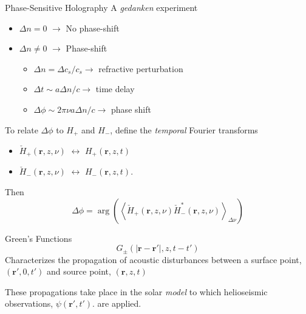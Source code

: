 \documentclass{beamer}
\begin{document}
\begin{frame}{Phase-Sensitive Holography}
{A \emph{gedanken} experiment}
    \begin{itemize}
        \item $\Delta{n} = 0$ $\rightarrow$ No phase-shift
        \item $\Delta{n} \neq 0$ $\rightarrow$ Phase-shift
            \begin{itemize}
                \item $\Delta{n} = \Delta{c_{s}}/c_{s} \rightarrow$
                    refractive perturbation
                \item $\Delta{t} \sim a\Delta{n}/c \rightarrow$
                    time delay
                \item $\Delta{\phi} \sim 2\pi\nu a\Delta{n}/c \rightarrow$
                    phase shift
            \end{itemize}
    \end{itemize}

    To relate $\Delta\phi$ to $H_{+}$ and $H_{-}$, define the
    \emph{temporal} Fourier transforms
    \begin{itemize}
        \item $ \check{H}_{+}(\mathbf{r},z,\nu)  $
            $ \leftrightarrow$
            $ {H}_{+}(\mathbf{r},z,t)  $
        \item $ \check{H}_{-}(\mathbf{r},z,\nu)  $
            $ \leftrightarrow$
            $ {H}_{-}(\mathbf{r},z,t)$.
    \end{itemize}
    Then
    $$ \Delta\phi = \arg\left(\left\langle
        \check{H}_{+}(\mathbf{r},z,\nu)
        \check{H}_{-}^{*}(\mathbf{r},z,\nu)
        \right\rangle
        _{\Delta\nu}
        \right) $$
\end{frame}

\begin{frame}{Green's Functions}
    $$ G_{\pm}(|\mathbf{r}-\mathbf{r}'|,z,t-t') $$
    Characterizes the propagation of acoustic disturbances
    between a surface point,
    $(\mathbf{r}',0,t')$ and source point, $(\mathbf{r},z,t)$

    These propagations take place in the solar \emph{model}
    to which helioseismic observations, $\psi(\mathbf{r}',t')$.  are applied.
\end{frame}
\end{document}
